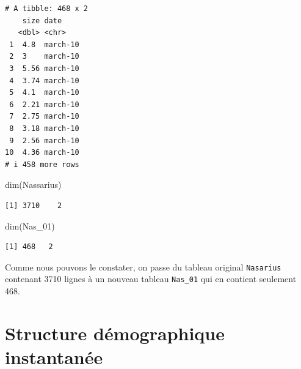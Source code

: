 \documentclass[
  a4paper,
  DIV=11,
  numbers=noendperiod,
  oneside]{scrreprt}
\newenvironment{Shaded}{}{}
\newcommand{\FunctionTok}[1]{\textcolor[rgb]{0.44,0.26,0.76}{#1}}
\newcommand{\NormalTok}[1]{\textcolor[rgb]{0.14,0.16,0.18}{#1}}
\begin{document}
\begin{verbatim}
# A tibble: 468 x 2
    size date    
   <dbl> <chr>   
 1  4.8  march-10
 2  3    march-10
 3  5.56 march-10
 4  3.74 march-10
 5  4.1  march-10
 6  2.21 march-10
 7  2.75 march-10
 8  3.18 march-10
 9  2.56 march-10
10  4.36 march-10
# i 458 more rows
\end{verbatim}


\begin{Shaded}
\begin{Highlighting}[]
\FunctionTok{dim}\NormalTok{(Nassarius)}
\end{Highlighting}
\end{Shaded}

\begin{verbatim}
[1] 3710    2
\end{verbatim}

\begin{Shaded}
\begin{Highlighting}[]
\FunctionTok{dim}\NormalTok{(Nas\_01)}
\end{Highlighting}
\end{Shaded}

\begin{verbatim}
[1] 468   2
\end{verbatim}


Comme nous pouvons le constater, on passe du tableau original
\texttt{Nasarius} contenant 3710 lignes à un nouveau tableau
\texttt{Nas\_01} qui en contient seulement 468.

\hypertarget{structure-duxe9mographique-instantanuxe9e}{%
\section{Structure démographique
instantanée}\label{structure-duxe9mographique-instantanuxe9e}}
\end{document}
